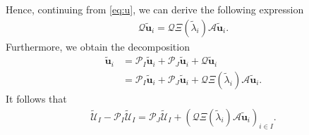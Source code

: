 \documentclass[reqno]{amsart}
\theoremstyle{plain}
\theoremstyle{definition}
\begin{document}
Hence, continuing from \eqref{eq:u}, we can derive the following expression
\begin{align*}
\mathcal Q \widetilde{\mathbf u}_i = \mathcal Q \Xi(\widetilde \lambda_i) \mathcal A \widetilde{\mathbf u}_i.
\end{align*}
Furthermore, we obtain the decomposition
\begin{align*}
\widetilde{\mathbf u}_i &= \mathcal P_I \widetilde{\mathbf u}_i + \mathcal P_J \widetilde{\mathbf u}_i + \mathcal Q \widetilde{\mathbf u}_i\\
&=\mathcal P_I \widetilde{\mathbf u}_i + \mathcal P_J \widetilde{\mathbf u}_i +  \mathcal Q \Xi(\widetilde \lambda_i) \mathcal A \widetilde{\mathbf u}_i.
\end{align*}
It follows that
\begin{align}\label{eq:decompU}
\widetilde{\mathcal U}_I - \mathcal P_I \widetilde{\mathcal U}_I = \mathcal P_J \widetilde{\mathcal U}_I + (\mathcal Q \Xi(\widetilde \lambda_i) \mathcal A \widetilde{\mathbf u}_i)_{i\in I}.
\end{align}
\end{document}
